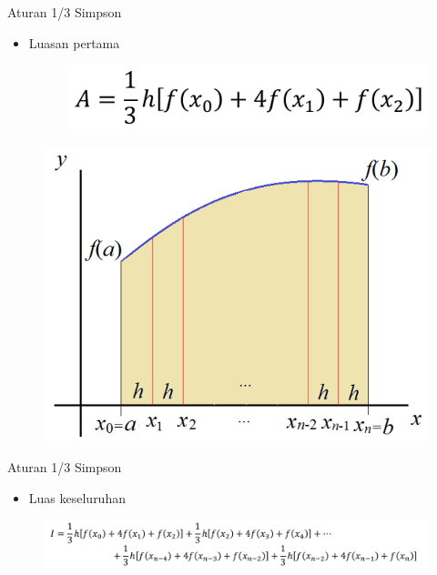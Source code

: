 \documentclass[pdflatex,compress,mathserif]{beamer}
\begin{document}
\begin{frame}{Aturan 1/3 Simpson}
    \begin{itemize}
        \item Luasan pertama
        \begin{figure}
            \centering
            \includegraphics[width=0.6\linewidth]{./img/img06.png}
        \end{figure}
    \end{itemize}
    \begin{figure}
        \centering
        \includegraphics[width=0.6\linewidth]{./img/img05.png}
    \end{figure}
\end{frame}

\begin{frame}{Aturan 1/3 Simpson}
    \begin{itemize}
        \item Luas keseluruhan
    \end{itemize}
    \begin{figure}
        \centering
        \includegraphics[width=\linewidth]{./img/img07.png}
    \end{figure}
\end{frame}
\end{document}
